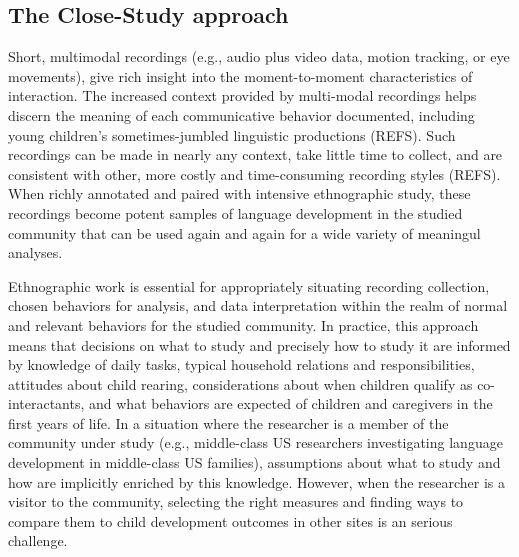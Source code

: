 \documentclass[,man,floatsintext]{apa6}
\begin{document}
\subsection{The Close-Study approach}\label{the-close-study-approach}

Short, multimodal recordings (e.g., audio plus video data, motion
tracking, or eye movements), give rich insight into the moment-to-moment
characteristics of interaction. The increased context provided by
multi-modal recordings helps discern the meaning of each communicative
behavior documented, including young children's sometimes-jumbled
linguistic productions (REFS). Such recordings can be made in nearly any
context, take little time to collect, and are consistent with other,
more costly and time-consuming recording styles (REFS). When richly
annotated and paired with intensive ethnographic study, these recordings
become potent samples of language development in the studied community
that can be used again and again for a wide variety of meaningul
analyses.

Ethnographic work is essential for appropriately situating recording
collection, chosen behaviors for analysis, and data interpretation
within the realm of normal and relevant behaviors for the studied
community. In practice, this approach means that decisions on what to
study and precisely how to study it are informed by knowledge of daily
tasks, typical household relations and responsibilities, attitudes about
child rearing, considerations about when children qualify as
co-interactants, and what behaviors are expected of children and
caregivers in the first years of life. In a situation where the
researcher is a member of the community under study (e.g., middle-class
US researchers investigating language development in middle-class US
families), assumptions about what to study and how are implicitly
enriched by this knowledge. However, when the researcher is a visitor to
the community, selecting the right measures and finding ways to compare
them to child development outcomes in other sites is an serious
challenge.
\end{document}
